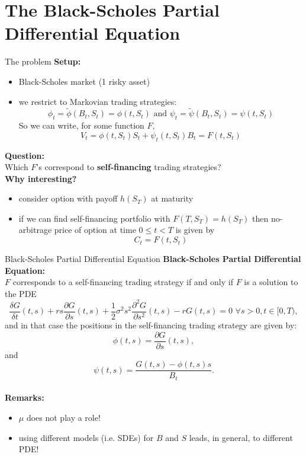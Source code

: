 \documentclass[pdf, handout]{beamer}
\begin{document}
\section[toc=Black-Scholes PDE]{The Black-Scholes Partial Differential Equation}

\begin{frame}{The problem}
\textbf{Setup:}
\begin{itemize}
\item Black-Scholes market (1 risky asset)
\item we restrict to
Markovian trading strategies:
\[
\phi_t=\tilde\phi(B_t, S_t)= \phi(t,S_t) \text{ and } \psi_t=\tilde\psi(B_t, S_t)
=\psi (t, S_t)
\]
So we can write, for some function $F$,
\[
 V_t=\phi(t, S_t) S_t + \psi_t(t, S_t) B_t=F(t, S_t)
\]
\end{itemize}
\textbf{Question:} \\
Which $F$'s correspond to \textbf{self-financing} trading strategies?
\\ \vspace{.25cm}
\textbf{Why interesting?}
\begin{itemize}
\item consider option with payoff $h(S_T)$ at maturity
\item if we can find self-financing portfolio with $F(T, S_T)= h(S_T)$ then
no-arbitrage price of option at time $0\leq t <T$ is given by
\[
C_t=F(t, S_t)
\]
\end{itemize}
\end{frame}

\begin{frame}{Black-Scholes Partial Differential Equation}
\textbf{Black-Scholes Partial Differential Equation:} \\
$F$ corresponds to a self-financing trading strategy if and only if $F$ is a solution to the PDE
\[
\frac{\delta G}{\delta t}(t, s) + r s \frac{\partial G}{\partial
s}(t, s) + \frac{1}{2}\sigma^2 s^2 \frac{\partial^2 G}{\partial
s^2}(t,s) -r G(t,s )=0\,\, \forall s>0, t\in[0, T),
\]
and in that case the positions in the self-financing trading strategy are given by:
\[
\phi(t,s)=\frac{\partial G}{\partial s}(t, s),
\]
and
\[
\psi(t,s)=\frac{G(t,s)-\phi(t,s) s}{B_t}.
\]
\\ \vspace{.3cm}
\textbf{Remarks:}
\begin{itemize}
\item  $\mu$ does not play a role!
\item using different models (i.e. SDEs)
for $B$ and $S$ leads, in general, to
different PDE!
\end{itemize}
\end{frame}
\end{document}
